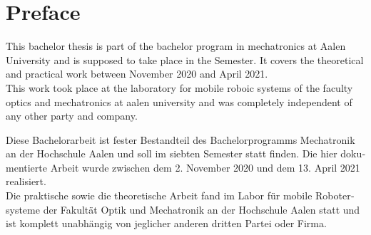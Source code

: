 \chapter*{Preface}
\label{preface}

This bachelor thesis is part of the bachelor program in mechatronics at Aalen University and is supposed to take place in the  Semester. It covers the theoretical and practical work between November  2020 and April  2021.\\

This work took place at the laboratory for mobile roboic systems of the faculty optics and mechatronics at aalen university and was completely independent of any other party and company.

\vspace*{25mm}

\begin{otherlanguage}{ngerman}
Diese Bachelorarbeit ist fester Bestandteil des Bachelorprogramms Mechatronik an der Hochschule Aalen und soll im siebten Semester statt finden. Die hier dokumentierte Arbeit wurde zwischen dem 2. November 2020 und dem 13. April 2021 realisiert.\\

Die praktische sowie die theoretische Arbeit fand im Labor für mobile Robotersysteme der Fakultät Optik und Mechatronik an der Hochschule Aalen statt und ist komplett unabhängig von jeglicher anderen dritten Partei oder Firma.
\end{otherlanguage}